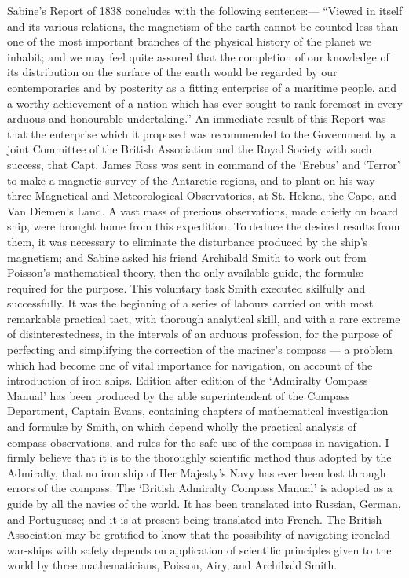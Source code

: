 \documentclass[a4paper, 11pt, oneside, english]{article}
\begin{document}
Sabine's Report of 1838 concludes with the following sentence:--- ``Viewed in itself and its various relations, the magnetism of the earth cannot be counted less than one of the most important branches of the physical history of the planet we inhabit; and we may feel quite assured that the completion of our knowledge of its distribution on the surface of the earth would be regarded by our contemporaries and by posterity as a fitting enterprise of a maritime people, and a worthy achievement of a nation which has ever sought to rank foremost in every arduous and honourable undertaking.'' An immediate result of this Report was that the enterprise which it proposed was recommended to the Government by a joint Committee of the British Association and the Royal Society with such success, that Capt. James Ross was sent in command of the `Erebus' and `Terror' to make a magnetic survey of the Antarctic regions, and to plant on his way three Magnetical and Meteorological Observatories, at St. Helena, the Cape, and Van Diemen's Land. A vast mass of precious observations, made chiefly on board ship, were brought home from this expedition. To deduce the desired results from them, it was necessary to eliminate the disturbance produced by the ship's magnetism; and Sabine asked his friend Archibald Smith to work out from Poisson's mathematical theory, then the only available guide, the formulæ required for the purpose. This voluntary task Smith executed skilfully and successfully. It was the beginning of a series of labours carried on with most remarkable practical tact, with thorough analytical skill, and with a rare extreme of disinterestedness, in the intervals of an arduous profession, for the purpose of perfecting and simplifying the correction of the mariner's compass --- a problem which had become one of vital importance for navigation, on account of the introduction of iron ships. Edition after edition of the `Admiralty Compass Manual' has been produced by the able superintendent of the Compass Department, Captain Evans, containing chapters of mathematical investigation and formulæ by Smith, on which depend wholly the practical analysis of compass-observations, and rules for the safe use of the compass in navigation. I firmly believe that it is to the thoroughly scientific method thus adopted by the Admiralty, that no iron ship of Her Majesty's Navy has ever been lost through errors of the compass. The `British Admiralty Compass Manual' is adopted as a guide by all the navies of the world. It has been translated into Russian, German, and Portuguese; and it is at present being translated into French. The British Association may be gratified to know that the possibility of navigating ironclad war-ships with safety depends on application of scientific principles given to the world by three mathematicians, Poisson, Airy, and Archibald Smith.
\end{document}
